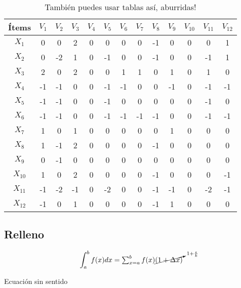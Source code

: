 \documentclass[letterpaper,11pt]{article}	%
\newcommand{\insertequationcaptioned}[2]{	%
	\vspace{-0.2cm}
	\begin{mycapequ}[H]
		\begin{equation}
		#1
		\end{equation}
		\vspace{-0.6cm}
		\caption{#2}
	\end{mycapequ}
	\vspace{-0.25cm}
}
\begin{document}
		\begin{table}[H]
			\centering
			\caption{También puedes usar tablas así, aburridas!}
			\label{tablafome}
			\begin{tabular}{|c|c|c|c|c|c|c|c|c|c|c|c|c|}
				\hline
				Ítems & ${V}_{1}$ & ${V}_{2}$ & ${V}_{3}$ & ${V}_{4}$ & ${V}_{5}$ & ${V}_{6}$ & ${V}_{7}$ & ${V}_{8}$ & ${V}_{9}$ & ${V}_{10}$ & ${V}_{11}$ & ${V}_{12}$ \\ \hline
				${X}_{1}$             & 0  & 0  & 2  & 0  & 0  & 0  & 0  & -1 & 0  & 0   & 0   & 1   \\ \hline
				${X}_{2}$             & 0  & -2 & 1  & 0  & -1 & 0  & 0  & -1 & 0  & 0   & -1  & 1   \\ \hline
				${X}_{3}$             & 2  & 0  & 2  & 0  & 0  & 1  & 1  & 0  & 1  & 0   & 1   & 0   \\ \hline
				${X}_{4}$             & -1 & -1 & 0  & 0  & -1 & -1 & 0  & 0  & -1 & 0   & -1  & -1  \\ \hline
				${X}_{5}$             & -1 & -1 & 0  & 0  & -1 & 0  & 0  & 0  & 0  & 0   & -1  & 0   \\ \hline
				${X}_{6}$             & -1 & -1 & 0  & 0  & -1 & -1 & -1 & -1 & 0  & 0   & -1  & -1  \\ \hline
				${X}_{7}$             & 1  & 0  & 1  & 0  & 0  & 0  & 0  & 0  & 1  & 0   & 0   & 0   \\ \hline
				${X}_{8}$             & 1  & -1 & 2  & 0  & 0  & 0  & 0  & -1 & 0  & 0   & 0   & 0   \\ \hline
				${X}_{9}$             & 0  & -1 & 0  & 0  & 0  & 0  & 0  & 0  & 0  & 0   & 0   & 0   \\ \hline
				${X}_{10}$            & 1  & 0  & 2  & 0  & 0  & 0  & 0  & -1 & 0  & 0   & 0   & -1  \\ \hline
				${X}_{11}$            & -1 & -2 & -1 & 0  & -2 & 0  & 0  & -1 & -1 & 0   & -2  & -1  \\ \hline
				${X}_{12}$            & -1 & 0  & 1  & 0  & 0  & 0  & 0  & -1 & 1  & 0   & 0   & 0   \\ \hline
			\end{tabular}
		\end{table}
		
	
	\subsection{Relleno}
		
		\insertequationcaptioned{\int_{a}^{b} f(x) dx = \textstyle \sum_{x=a}^{b} f(x)\cancelto{1+\frac{\epsilon}{k}}{(1+\Delta x)}}{Ecuación sin sentido}
		
\end{document}
